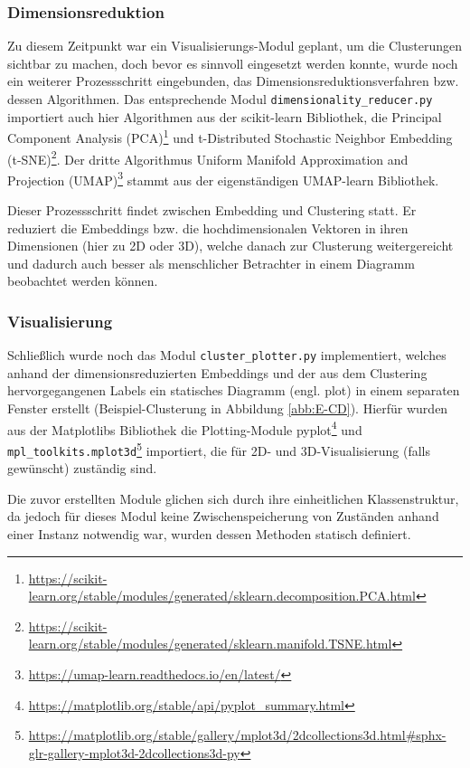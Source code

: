 \subsubsection*{Dimensionsreduktion}
Zu diesem Zeitpunkt war ein Visualisierungs-Modul geplant, um die Clusterungen sichtbar zu machen, doch bevor es sinnvoll eingesetzt werden konnte, wurde noch ein weiterer Prozessschritt eingebunden, das Dimensionsreduktionsverfahren bzw. dessen Algorithmen. Das entsprechende Modul \texttt{dimensionality\_reducer.py} importiert auch hier Algorithmen aus der scikit-learn Bibliothek, die Principal Component Analysis (PCA)\footnote{\url{https://scikit-learn.org/stable/modules/generated/sklearn.decomposition.PCA.html}} und t-Distributed Stochastic Neighbor Embedding (t-SNE)\footnote{\url{https://scikit-learn.org/stable/modules/generated/sklearn.manifold.TSNE.html}}. Der dritte Algorithmus Uniform Manifold Approximation and Projection (UMAP)\footnote{\url{https://umap-learn.readthedocs.io/en/latest/}} stammt aus der eigenständigen UMAP-learn Bibliothek. 

Dieser Prozessschritt findet zwischen Embedding und Clustering statt. Er reduziert die Embeddings bzw. die hochdimensionalen Vektoren in ihren Dimensionen (hier zu 2D oder 3D), welche danach zur Clusterung weitergereicht und dadurch auch besser als menschlicher Betrachter in einem Diagramm beobachtet werden können.


\subsubsection*{Visualisierung}
Schließlich wurde noch das Modul \texttt{cluster\_plotter.py} implementiert, welches anhand der dimensionsreduzierten Embeddings und der aus dem Clustering hervorgegangenen Labels ein statisches Diagramm (engl. plot) in einem separaten Fenster erstellt (Beispiel-Clusterung in Abbildung \ref{abb:E-CD}). Hierfür wurden aus der Matplotlibs Bibliothek die Plotting-Module pyplot\footnote{\url{https://matplotlib.org/stable/api/pyplot_summary.html}} und \texttt{mpl\_toolkits.mplot3d}\footnote{\url{https://matplotlib.org/stable/gallery/mplot3d/2dcollections3d.html\#sphx-glr-gallery-mplot3d-2dcollections3d-py}} importiert, die für 2D- und 3D-Visualisierung (falls gewünscht) zuständig sind.

Die zuvor erstellten Module glichen sich durch ihre einheitlichen Klassenstruktur, da jedoch für dieses Modul keine Zwischenspeicherung von Zuständen anhand einer Instanz notwendig war, wurden dessen Methoden statisch definiert.


